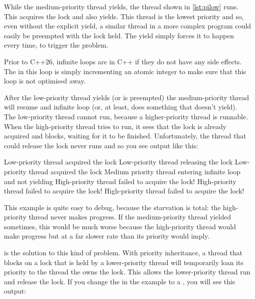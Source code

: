 While the medium-priority thread yields, the thread shown in \ref{lst:pilow} runs.
This acquires the lock and also yields.
This thread is the lowest priority and so, even without the explicit yield, a similar thread in a more complex program could easily be preempted with the lock held.
The yield simply forces it to happen every time, to trigger the problem.

\begin{note}
	Prior to C++26, infinite loops are  in C++ if they do not have any side effects.
	The  in this loop is simply incrementing an atomic integer to make sure that this loop is not optimised away.
\end{note}

\codelisting[filename=examples/priority_inheritance/priority_inheritance.cc,marker=low,label=lst:pilow,caption="A low-priority thread that will be preempted with a lock held"]{}

After the low-priority thread yields (or is preempted) the medium-priority thread will resume and infinite loop (or, at least, does something that doesn't yield).
The low-priority thread cannot run, because a higher-priority thread is runnable.
When the high-priority thread tries to run, it sees that the lock is already acquired and blocks, waiting for it to be finished.
Unfortunately, the thread that could release the lock never runs and so you see output like this:

\begin{console}
Low-priority thread acquired the lock
Low-priority thread releasing the lock
Low-priority thread acquired the lock
Medium priority thread entering infinite loop and not yielding
High-priority thread failed to acquire the lock!
High-priority thread failed to acquire the lock!
High-priority thread failed to acquire the lock!
\end{console}

This example is quite easy to debug, because the starvation is total: the high-priority thread never makes progress.
If the medium-priority thread yielded sometimes, this would be much worse because the high-priority thread would make progress but at a far slower rate than its priority would imply.

 is the solution to this kind of problem.
With priority inheritance, a thread that blocks on a lock that is held by a lower-priority thread will temporarily loan its priority to the thread the owns the lock.
This allows the lower-priority thread run and release the lock.
If you change the  in the example to a , you will see this output:

